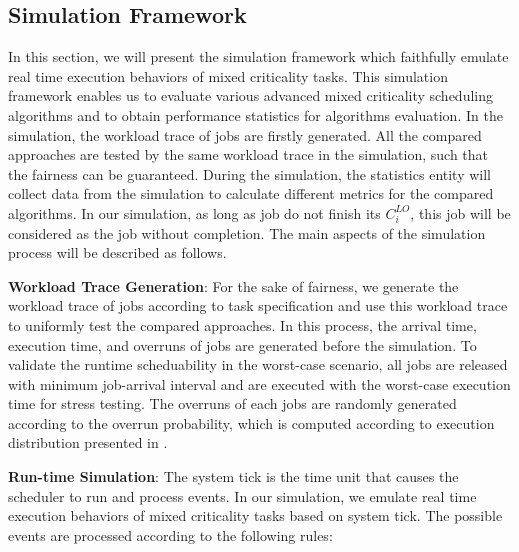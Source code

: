 \documentclass[10pt,journal,compsoc]{IEEEtran}
\begin{document}
\begin{appendices}
\section{Simulation Framework}
\label{appendix:III}
{
In this section, we will present the simulation framework which faithfully emulate real time execution behaviors of mixed criticality tasks. This simulation framework enables us to evaluate various advanced mixed criticality scheduling algorithms and to obtain performance statistics for algorithms evaluation. 
In the simulation, the workload trace of jobs are firstly generated. All the compared approaches are tested by the same workload trace in the simulation, such that the fairness can be guaranteed. During the simulation, the statistics entity will collect data from the simulation to calculate different metrics for the compared algorithms. In our simulation, as long as \lo job do not finish its $C_i^{LO}$, this \lo job will be considered as the job without completion. The main aspects of the simulation process will be described as follows.

\noindent\textbf{Workload Trace Generation}: For the sake of fairness, we generate the workload trace of jobs according to task specification and use this workload trace to uniformly test the compared approaches. In this process, the arrival time, execution time, and overruns of jobs are generated before the simulation. To validate the runtime scheduability in the worst-case scenario, all jobs are released with minimum job-arrival interval and are executed with the worst-case execution time for stress testing. The overruns of each \hi jobs are randomly generated according to the overrun probability, which is computed according to execution distribution presented in \cite{Back}. 

\noindent\textbf{Run-time Simulation}: The system tick is the time unit that causes the scheduler to run and process events. In our simulation, we emulate real time execution behaviors of mixed criticality tasks based on system tick. The possible events are processed according to the following rules:

}
\end{appendices}
\end{document}
